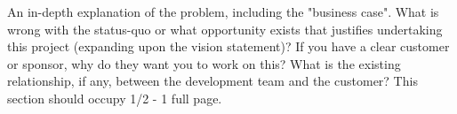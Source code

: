 An in-depth explanation of the problem, including the "business case". What is wrong with the status-quo or what opportunity exists that justifies undertaking this project (expanding upon the vision statement)? If you have a clear customer or sponsor, why do they want you to work on this? What is the existing relationship, if any, between the development team and the customer? This section should occupy 1/2 - 1 full page.